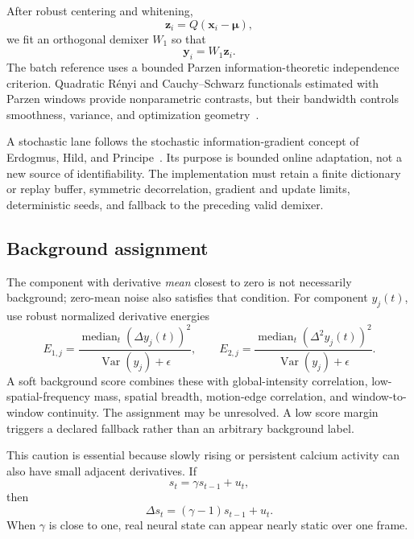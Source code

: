 \documentclass[11pt]{article}
\newcommand{\Var}{\operatorname{Var}}
\begin{document}
After robust centering and whitening,
\begin{equation}
\bm z_i=Q(\bm x_i-\bm\mu),
\end{equation}
we fit an orthogonal demixer \(W_1\) so that
\begin{equation}
\bm y_i=W_1\bm z_i.
\end{equation}
The batch reference uses a bounded Parzen information-theoretic independence
criterion. Quadratic R\'enyi and Cauchy--Schwarz functionals estimated with
Parzen windows provide nonparametric contrasts, but their bandwidth controls
smoothness, variance, and optimization geometry~\cite{erdogmus2004deconv,principe2010}.

A stochastic lane follows the stochastic information-gradient concept of
Erdogmus, Hild, and Principe~\cite{erdogmus2003sig}. Its purpose is bounded
online adaptation, not a new source of identifiability. The implementation must
retain a finite dictionary or replay buffer, symmetric decorrelation, gradient
and update limits, deterministic seeds, and fallback to the preceding valid
demixer.

\subsection{Background assignment}

The component with derivative \emph{mean} closest to zero is not necessarily
background; zero-mean noise also satisfies that condition. For component
\(y_j(t)\), use robust normalized derivative energies
\begin{equation}
E_{1,j}=
\frac{\operatorname{median}_t(\Delta y_j(t))^2}
{\Var(y_j)+\epsilon},
\qquad
E_{2,j}=
\frac{\operatorname{median}_t(\Delta^2 y_j(t))^2}
{\Var(y_j)+\epsilon}.
\end{equation}
A soft background score combines these with global-intensity correlation,
low-spatial-frequency mass, spatial breadth, motion-edge correlation, and
window-to-window continuity. The assignment may be unresolved. A low score
margin triggers a declared fallback rather than an arbitrary background label.

This caution is essential because slowly rising or persistent calcium activity
can also have small adjacent derivatives. If
\begin{equation}
s_t=\gamma s_{t-1}+u_t,
\end{equation}
then
\begin{equation}
\Delta s_t=(\gamma-1)s_{t-1}+u_t.
\end{equation}
When \(\gamma\) is close to one, real neural state can appear nearly static over
one frame.
\end{document}
